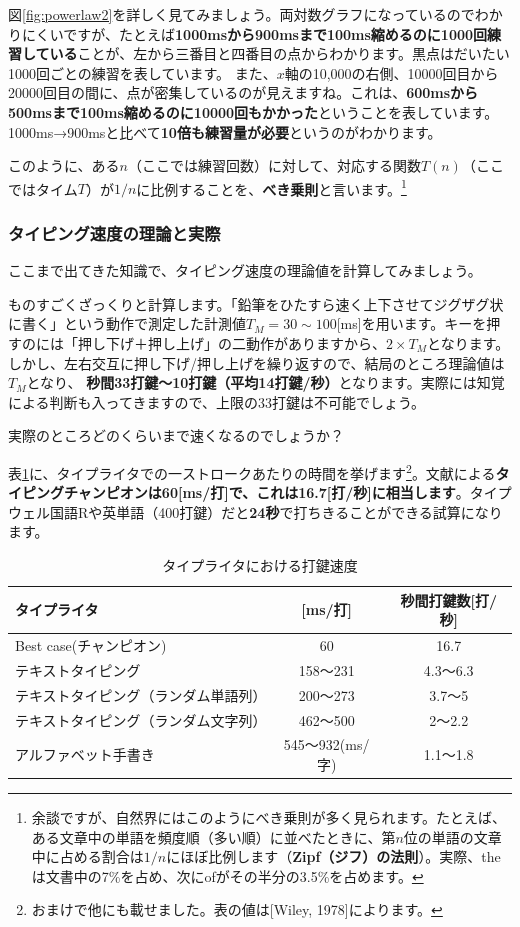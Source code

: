図\ref{fig:powerlaw2}を詳しく見てみましょう。両対数グラフになっているのでわかりにくいですが、たとえば{\bf 1000msから900msまで100ms縮めるのに1000回練習している}ことが、左から三番目と四番目の点からわかります。黒点はだいたい1000回ごとの練習を表しています。
また、$x$軸の10,000の右側、10000回目から20000回目の間に、点が密集しているのが見えますね。これは、{\bf 600msから500msまで100ms縮めるのに10000回もかかった}ということを表しています。1000ms→900msと比べて{\bf 10倍も練習量が必要}というのがわかります。

このように、ある$n$（ここでは練習回数）に対して、対応する関数$T(n)$（ここではタイム$T$）が$1/n$に比例することを、{\bf べき乗則}と言います。\footnote{余談ですが、自然界にはこのようにべき乗則が多く見られます。たとえば、ある文章中の単語を頻度順（多い順）に並べたときに、第$n$位の単語の文章中に占める割合は$1/n$にほぼ比例します（{\bf Zipf（ジフ）の法則}）。実際、theは文書中の7\%を占め、次にofがその半分の3.5\%を占めます。}

\subsubsection*{タイピング速度の理論と実際}

ここまで出てきた知識で、タイピング速度の理論値を計算してみましょう。

ものすごくざっくりと計算します。「鉛筆をひたすら速く上下させてジグザグ状に書く」という動作で測定した計測値$T_M = 30 \sim 100$[ms]を用います。キーを押すのには「押し下げ＋押し上げ」の二動作がありますから、$2\times T_M$となります。
しかし、左右交互に押し下げ/押し上げを繰り返すので、結局のところ理論値は$T_M$となり、%
{\bf 秒間33打鍵～10打鍵（平均14打鍵/秒）}となります。実際には知覚による判断も入ってきますので、上限の33打鍵は不可能でしょう。

実際のところどのくらいまで速くなるのでしょうか？

表\ref{tbl:speed}に、タイプライタでの一ストロークあたりの時間を挙げます\footnote{おまけで他にも載せました。表の値は[Wiley, 1978]によります。}。文献による{\bf タイピングチャンピオンは60[ms/打]で、これは16.7[打/秒]に相当します}。タイプウェル国語Rや英単語（400打鍵）だと{\bf 24秒}で打ちきることができる試算になります。

\begin{table}[htbp]
 \begin{center}
     \caption{タイプライタにおける打鍵速度}
 \begin{tabular}{lcc}
\hline
タイプライタ & [ms/打] & 秒間打鍵数[打/秒] \\
\hline
Best case(チャンピオン) & 60 & 16.7 \\
テキストタイピング & 158～231 & 4.3～6.3 \\
テキストタイピング（ランダム単語列） & 200～273 & 3.7～5 \\
テキストタイピング（ランダム文字列） & 462～500 & 2～2.2 \\
アルファベット手書き & 545～932(ms/字)  & 1.1～1.8 \\
\hline
 \end{tabular}
 \label{tbl:speed}
 \end{center}
\end{table}

